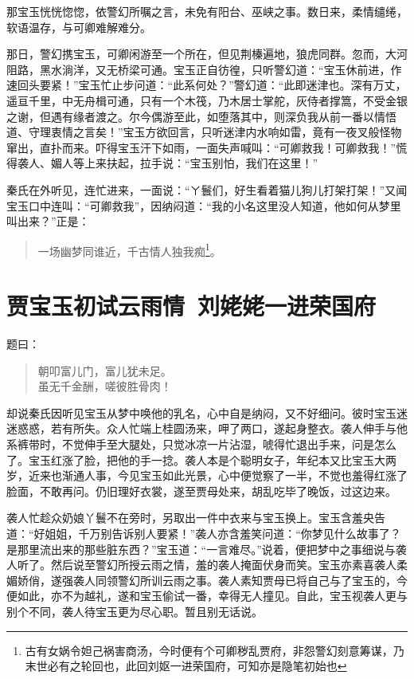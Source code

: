 \documentclass[12pt,oneside]{book}
\newenvironment{shici}{%
\begin{verse}%
\centering\large\hspace{12pt}}%
{\end{verse}}
\begin{document}
那宝玉恍恍惚惚，依警幻所嘱之言，未免有阳台、巫峡之事。数日来，柔情缱绻，软语温存，与可卿难解难分。

那日，警幻携宝玉，可卿闲游至一个所在，但见荆榛遍地，狼虎同群。忽而，大河阻路，黑水淌洋，又无桥梁可通。宝玉正自彷徨，只听警幻道：“宝玉休前进，作速回头要紧！”宝玉忙止步问道：“此系何处？”警幻道：“此即迷津也。深有万丈，遥亘千里，中无舟楫可通，只有一个木筏，乃木居士掌舵，灰侍者撑篙，不受金银之谢，但遇有缘者渡之。尔今偶游至此，如堕落其中，则深负我从前一番以情悟道、守理衷情之言矣！”宝玉方欲回言，只听迷津内水响如雷，竟有一夜叉般怪物窜出，直扑而来。吓得宝玉汗下如雨，一面失声喊叫：“可卿救我！可卿救我！”慌得袭人、媚人等上来扶起，拉手说：“宝玉别怕，我们在这里！”

秦氏在外听见，连忙进来，一面说：“ㄚ鬟们，好生看着猫儿狗儿打架打架！”又闻宝玉口中连叫：“可卿救我”，因纳闷道：“我的小名这里没人知道，他如何从梦里叫出来？”正是：

\begin{shici}
一场幽梦同谁近，千古情人独我痴\footnote{古有女娲令妲己祸害商汤，今时便有个可卿秽乱贾府，非怨警幻刻意筹谋，乃末世必有之轮回也，此回刘妪一进荣国府，可知亦是隐笔初始也}。
\end{shici}


\chapter{贾宝玉初试云雨情~刘姥姥一进荣国府}
题曰：

\begin{shici}
朝叩富儿门，富儿犹未足。\\
虽无千金酬，嗟彼胜骨肉！
\end{shici}


却说秦氏因听见宝玉从梦中唤他的乳名，心中自是纳闷，又不好细问。彼时宝玉迷迷惑惑，若有所失。众人忙端上桂圆汤来，呷了两口，遂起身整衣。袭人伸手与他系裤带时，不觉伸手至大腿处，只觉冰凉一片沾湿，唬得忙退出手来，问是怎么了。宝玉红涨了脸，把他的手一捻。袭人本是个聪明女子，年纪本又比宝玉大两岁，近来也渐通人事，今见宝玉如此光景，心中便觉察了一半，不觉也羞得红涨了脸面，不敢再问。仍旧理好衣裳，遂至贾母处来，胡乱吃毕了晚饭，过这边来。

袭人忙趁众奶娘丫鬟不在旁时，另取出一件中衣来与宝玉换上。宝玉含羞央告道：“好姐姐，千万别告诉别人要紧！”袭人亦含羞笑问道：“你梦见什么故事了？是那里流出来的那些脏东西？”宝玉道：“一言难尽。”说着，便把梦中之事细说与袭人听了。然后说至警幻所授云雨之情，羞的袭人掩面伏身而笑。宝玉亦素喜袭人柔媚娇俏，遂强袭人同领警幻所训云雨之事。袭人素知贾母已将自己与了宝玉的，今便如此，亦不为越礼，遂和宝玉偷试一番，幸得无人撞见。自此，宝玉视袭人更与别个不同，袭人待宝玉更为尽心职。暂且别无话说。
\end{document}
